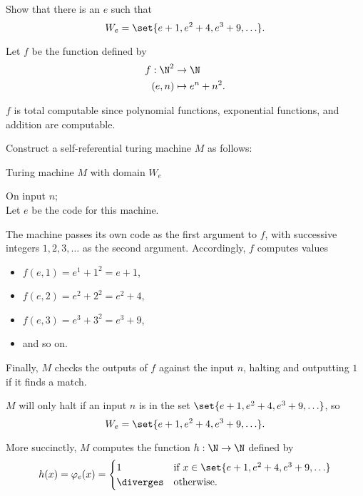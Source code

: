 \begin{problem}
  Show that there is an $e$ such that
  \[
    W_e = \set{ e+1, e^2+4, e^3+9, \ldots }.
  \]

  \begin{answer}
    Let $f$ be the function defined by
    \begin{align*}
      f : \N^2 &\to \N \\
      (e, n) &\mapsto e^n + n^2.
    \end{align*}

    $f$ is total computable since polynomial functions,
    exponential functions, and addition are computable.

    Construct a self-referential turing machine $M$
    as follows:

    \step
    \begin{algorithm}[H]\label{tm:7.1}
      \caption{Turing machine $M$ with domain $W_e$}
      On input $n$; \\
      Let $e$ be the code for this machine. \\
    \end{algorithm}

    \step
    The machine passes its own code as the first argument to $f$,
    with successive integers $1, 2, 3, \ldots$ as the second argument.
    Accordingly, $f$ computes values

    \begin{itemize}
      \item $f(e, 1) = e^1 + 1^2 = e+1$,
      \item $f(e, 2) = e^2 + 2^2 = e^2 + 4$,
      \item $f(e, 3) = e^3 + 3^2 = e^3 + 9$,
      \item and so on.
    \end{itemize}

    Finally, $M$ checks the outputs of $f$ against the input $n$,
    halting and outputting $1$ if it finds a match.

    $M$ will only halt if an input $n$ is in the set
    $\set{ e+1, e^2+4, e^3+9, \ldots }$,
    so \[ W_e = \set{ e+1, e^2+4, e^3+9, \ldots }. \]

    More succinctly, $M$ computes the function $h : \N \to \N$
    defined by
    \[
      h(x) = \varphi_e(x) = \begin{cases}
        1 & \text{if $x \in \set{ e+1, e^2+4, e^3+9, \ldots }$} \\
        \diverges & \text{otherwise}.
      \end{cases}
    \]
    

  \end{answer}
\end{problem}
